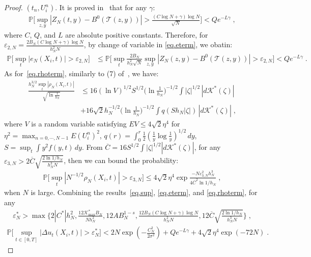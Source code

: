 \documentclass[a4paper,11pt]{article}
\begin{document}
\begin{proof}
	$(t_n,U_i^n)$. It is proved in~\cite{tusnady1977remark} that for any $\gamma$:
\begin{align}
\mathbb{P}\Big[\sup_{z,y}|Z_N(t,y)-B^0(\mathcal{T}(z,y))|>\frac{(C\log N+\gamma)\log N}{\sqrt{N}}\Big]<Qe^{-L \gamma}\;,
\end{align}
where $C$, $Q$, and $L$ are absolute positive constants. Therefore, for  $\varepsilon_{2,N}=\frac{2B_N(C\log N+\gamma)\log N}{h_N^2N}$, by change of variable in \eqref{eq.eterm}, we obatin:
\begin{align*}
	\mathbb{P}\Big[\sup_{t}|e_N(X_i,t)|>\varepsilon_{2,N}\Big]&\leq\mathbb{P}\Big[\sup_{t}\frac{2B_N}{h^2_N\sqrt{N}}\sup_{z,y}|Z_N(z,y)-B^0(\mathcal{T}(z,y))|>\varepsilon_{2,N}\Big]<Qe^{-L\gamma}\;.
\end{align*}
As for~\eqref{eq.rhoterm}, similarly to (7) of~\cite{mack1982weak}, we have:
\begin{align*}
\frac{h_N^{3/2}\sup_t|\rho_N(X_i,t)|}{\sqrt{\ln\frac{1}{h_N}}}&\leq 16(\ln V)^{1/2}S^{1/2}\Big(\ln\frac{1}{h_N}\Big)^{-1/2}\int|\zeta|^{1/2}\,|d\mathcal{K}^*(\zeta)|\\
&+16\sqrt{2}h_N^{-1/2}\Big(\ln\frac{1}{h_N}\Big)^{-1/2}\int q(Sh_N|\zeta|)\,|d\mathcal{K}^*(\zeta)|\;,
\end{align*}
%
%
%
where  $V$ is a random variable satisfying $EV\leq 4\sqrt{2}\eta^4$ for $\eta^2 = \max_{n=0,\cdots,N-1}E(U_i^n)^2$, $q(r)=\int_0^r\frac{1}{2}(\frac{1}{y}\log\frac{1}{y})^{1/2}\,dy$, $S=\sup_t\int y^2f(y,t)\,dy$.  From $\overline{C}=16S^{1/2}\int|\zeta|^{1/2}|d\mathcal{K}^*(\zeta)|$,  for any $\varepsilon_{3,N}>2\overline{C}\sqrt{\frac{2\ln1/h_N}{h_N^3N}}$, then we can bound the probability:
\begin{align}
\mathbb{P}\Big[\sup_t|N^{-1/2}\rho_N(X_i,t)|>\varepsilon_{3,N}\Big]\leq 4\sqrt{2}\eta^4\exp\frac{-N\varepsilon_{3,N}^2h_N^3}{4\overline{C}^2\ln 1/h_N}\;,
\end{align}
when $N$ is large. Combining the results~\eqref{eq.sup}, \eqref{eq.eterm}, and \eqref{eq.rhoterm}, for any
\begin{align*}
\varepsilon_N^*>\max\{2|C^*|h_N^2,\frac{12\mathcal{K}^*_{\max}B_N}{Nh_N^2},12AB_N^{1-s},\frac{12B_N(C\log N+\gamma)\log N}{h_N^2N},12\overline{C}\sqrt{\frac{2\ln1/h_N}{h_N^3N}}\}	\;,
\end{align*}
\begin{align}
\mathbb{P}\Big[\sup_{t\in[0,T]}|\Delta u_t(X_i,t)|>\varepsilon_N^*\Big]<2N \exp(-\frac{C_N^2}{2\sigma^2})+Qe^{-L\gamma}+4\sqrt{2}\eta^4\exp(-72N)\;.
\end{align}
\end{proof}
\end{document}

